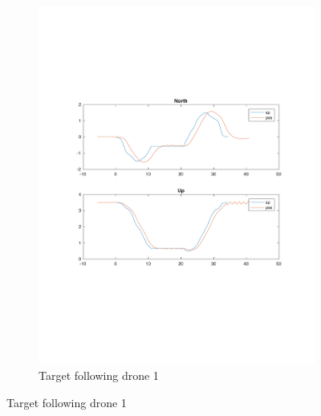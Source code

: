 \begin{figure}
\centering
   \begin{subfigure}[b]{0.8\textwidth}
   \includegraphics[width=1\linewidth]{chapters/chapter-04/figures/following_1_1.pdf}
   \caption{Target following drone 1}
   \label{fig:following_1_2}
\end{subfigure}


\end{figure}
